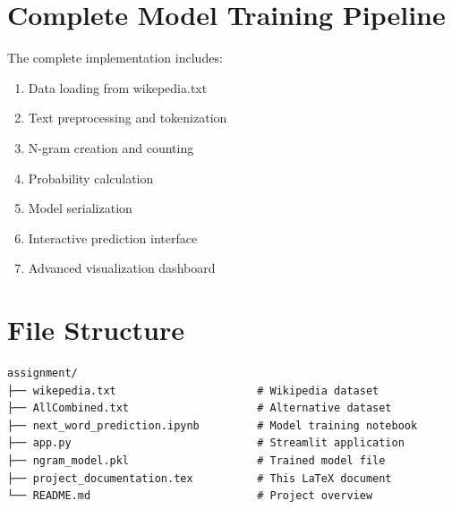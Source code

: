 \documentclass[12pt,a4paper]{report}
\begin{document}
\section{Complete Model Training Pipeline}

The complete implementation includes:
\begin{enumerate}
    \item Data loading from wikepedia.txt
    \item Text preprocessing and tokenization
    \item N-gram creation and counting
    \item Probability calculation
    \item Model serialization
    \item Interactive prediction interface
    \item Advanced visualization dashboard
\end{enumerate}

\section{File Structure}

\begin{verbatim}
assignment/
├── wikepedia.txt                      # Wikipedia dataset
├── AllCombined.txt                    # Alternative dataset
├── next_word_prediction.ipynb         # Model training notebook
├── app.py                             # Streamlit application
├── ngram_model.pkl                    # Trained model file
├── project_documentation.tex          # This LaTeX document
└── README.md                          # Project overview
\end{verbatim}
\end{document}
